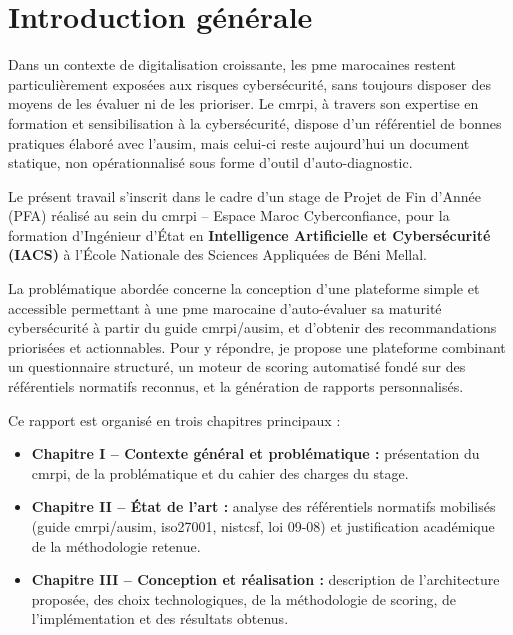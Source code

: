 \chapter*{Introduction générale}

\hspace{1cm}Dans un contexte de digitalisation croissante, les \gls{pme} marocaines restent particulièrement exposées aux risques cybersécurité, sans toujours disposer des moyens de les évaluer ni de les prioriser. Le \gls{cmrpi}, à travers son expertise en formation et sensibilisation à la cybersécurité, dispose d'un référentiel de bonnes pratiques élaboré avec l'\gls{ausim}, mais celui-ci reste aujourd'hui un document statique, non opérationnalisé sous forme d'outil d'auto-diagnostic.

Le présent travail s'inscrit dans le cadre d'un stage de Projet de Fin d'Année (PFA) réalisé au sein du \gls{cmrpi} -- Espace Maroc Cyberconfiance, pour la formation d'Ingénieur d'État en \textbf{Intelligence Artificielle et Cybersécurité (IACS)} à l'École Nationale des Sciences Appliquées de Béni Mellal.

\vspace{0.5cm}
La problématique abordée concerne la conception d'une plateforme simple et accessible permettant à une \gls{pme} marocaine d'auto-évaluer sa maturité cybersécurité à partir du guide \gls{cmrpi}/\gls{ausim}, et d'obtenir des recommandations priorisées et actionnables. Pour y répondre, je propose une plateforme combinant un questionnaire structuré, un moteur de scoring automatisé fondé sur des référentiels normatifs reconnus, et la génération de rapports personnalisés.

\vspace{0.5cm}
Ce rapport est organisé en trois chapitres principaux :

\begin{itemize}
  \item \textbf{Chapitre I -- Contexte général et problématique :} présentation du \gls{cmrpi}, de la problématique et du cahier des charges du stage.
  \item \textbf{Chapitre II -- État de l'art :} analyse des référentiels normatifs mobilisés (guide \gls{cmrpi}/\gls{ausim}, \gls{iso27001}, \gls{nistcsf}, loi 09-08) et justification académique de la méthodologie retenue.
  \item \textbf{Chapitre III -- Conception et réalisation :} description de l'architecture proposée, des choix technologiques, de la méthodologie de scoring, de l'implémentation et des résultats obtenus.
\end{itemize}
